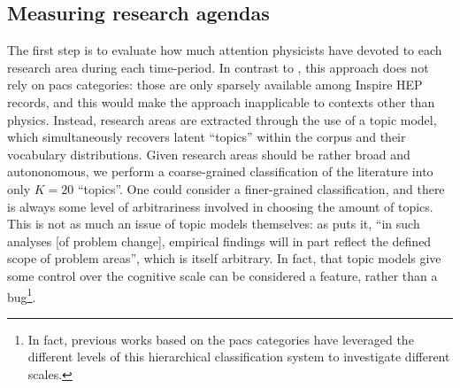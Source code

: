 \documentclass{article}
\begin{document}
\subsection{\label{sec:topics}Measuring research agendas}

The first step is to evaluate how much attention physicists have devoted to each research area during each time-period. In contrast to \citealt{Jia2017,Battiston2019,Aleta2019,Tripodi2020}, this approach does not rely on \gls{pacs} categories: those are only sparsely available among Inspire HEP records, and this would make the approach inapplicable to contexts other than physics. Instead, research areas are extracted through the use of a topic model, which simultaneously recovers latent ``topics'' within the corpus and their vocabulary distributions.  Given research areas should be rather broad and autononomous, we perform a coarse-grained classification of the literature into only $K=20$ ``topics''. One could consider a finer-grained classification, and there is always some level of arbitrariness involved in choosing the amount of topics. This is not as much an issue of topic models themselves: as \citet{Gieryn1978} puts it, ``in such analyses [of problem change], empirical findings will in part reflect the defined scope of problem areas'', which is itself arbitrary. In fact, that topic models give some control over the cognitive scale can be considered a feature, rather than a bug\footnote{In fact, previous works based on the \gls{pacs} categories have leveraged the different levels of this hierarchical classification system to investigate different scales. }.
\end{document}
